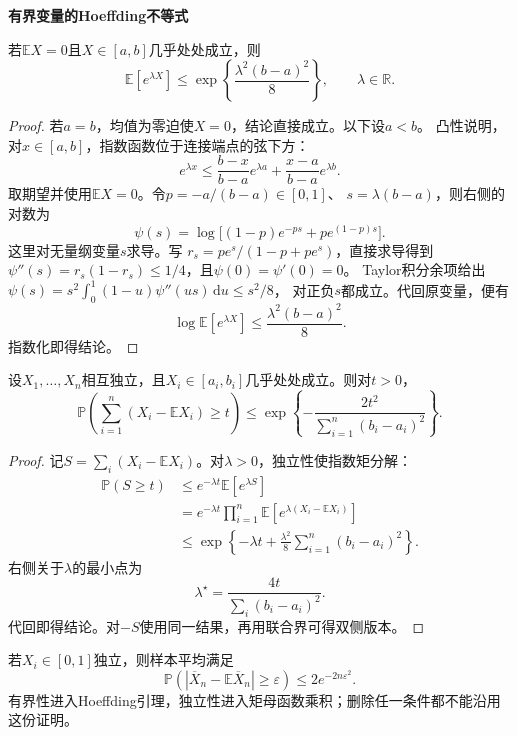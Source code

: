 \par\medskip\noindent\textbf{有界变量的Hoeffding不等式}\quad
\begin{lemma}[Hoeffding引理]
\label{lem:probability-hoeffding-lemma}
若\(\mathbb{E}X=0\)且\(X\in[a,b]\)几乎处处成立，则
\[ \mathbb{E}[e^{\lambda X}]
  \leq\exp\left\{\frac{\lambda^2(b-a)^2}{8}\right\},\qquad \lambda\in\mathbb{R}. \]
\end{lemma}

\begin{proof}
若\(a=b\)，均值为零迫使\(X=0\)，结论直接成立。以下设\(a<b\)。
凸性说明，对\(x\in[a,b]\)，指数函数位于连接端点的弦下方：
\[ e^{\lambda x}
  \leq\frac{b-x}{b-a}e^{\lambda a}+\frac{x-a}{b-a}e^{\lambda b}. \]
取期望并使用\(\mathbb{E}X=0\)。令\(p=-a/(b-a)\in[0,1]\)、
\(s=\lambda(b-a)\)，则右侧的对数为
\[
 \psi(s)=\log\bigl[(1-p)e^{-ps}+pe^{(1-p)s}\bigr].
\]
这里对无量纲变量\(s\)求导。写
\(r_s=pe^s/(1-p+pe^s)\)，直接求导得到
\(\psi''(s)=r_s(1-r_s)\leq1/4\)，且\(\psi(0)=\psi'(0)=0\)。
Taylor积分余项给出
\(\psi(s)=s^2\int_0^1(1-u)\psi''(us)\,\mathrm du\leq s^2/8\)，
对正负\(s\)都成立。代回原变量，便有
\[ \log\mathbb{E}[e^{\lambda X}]
  \leq\frac{\lambda^2(b-a)^2}{8}. \]
指数化即得结论。
\end{proof}

\begin{theorem}[Hoeffding不等式]
\label{thm:probability-hoeffding-inequality}
设\(X_1,\ldots,X_n\)相互独立，且\(X_i\in[a_i,b_i]\)几乎处处成立。则对\(t>0\)，
\[
  \mathbb{P}\left(
    \sum_{i=1}^{n}(X_i-\mathbb{E}X_i)\geq t
  \right)
  \leq
  \exp\left\{
    -\frac{2t^2}{\sum_{i=1}^{n}(b_i-a_i)^2}
  \right\}.
\]
\end{theorem}

\begin{proof}
记\(S=\sum_i(X_i-\mathbb{E}X_i)\)。对\(\lambda>0\)，独立性使指数矩分解：
\[
\begin{aligned}
  \mathbb{P}(S\geq t)
  &\leq
  e^{-\lambda t}\mathbb{E}[e^{\lambda S}]\\
  &=
  e^{-\lambda t}
  \prod_{i=1}^{n}
  \mathbb{E}\left[
    e^{\lambda(X_i-\mathbb{E}X_i)}
  \right]\\
  &\leq
  \exp\left\{
    -\lambda t+
    \frac{\lambda^2}{8}
    \sum_{i=1}^{n}(b_i-a_i)^2
  \right\}.
\end{aligned}
\]
右侧关于\(\lambda\)的最小点为
\[ \lambda^\star
  =\frac{4t}{\sum_i(b_i-a_i)^2}. \]
代回即得结论。对\(-S\)使用同一结果，再用联合界可得双侧版本。
\end{proof}

若\(X_i\in[0,1]\)独立，则样本平均满足
\[ \mathbb{P}(|\overline{X}_n-\mathbb{E}\overline{X}_n|
  \geq\varepsilon)\leq 2e^{-2n\varepsilon^2}. \]
有界性进入Hoeffding引理，独立性进入矩母函数乘积；删除任一条件都不能沿用这份证明。

